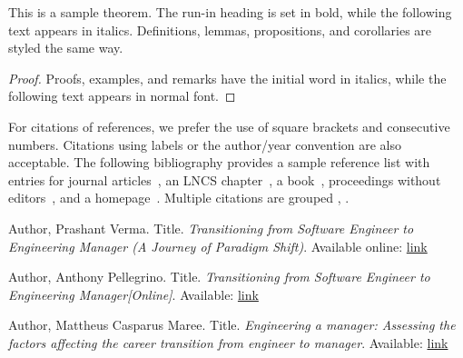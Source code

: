 \documentclass[runningheads]{llncs}
\begin{document}
\begin{theorem}
This is a sample theorem. The run-in heading is set in bold, while
the following text appears in italics. Definitions, lemmas,
propositions, and corollaries are styled the same way.
\end{theorem}
%
%
\begin{proof}
Proofs, examples, and remarks have the initial word in italics,
while the following text appears in normal font.
\end{proof}
For citations of references, we prefer the use of square brackets
and consecutive numbers. Citations using labels or the author/year
convention are also acceptable. The following bibliography provides
a sample reference list with entries for journal
articles~\cite{ref_article1}, an LNCS chapter~\cite{ref_lncs1}, a
book~\cite{ref_book1}, proceedings without editors~\cite{ref_proc1},
and a homepage~\cite{ref_url1}. Multiple citations are grouped
\cite{ref_article1,ref_lncs1,ref_book1},
\cite{ref_article1,ref_book1,ref_proc1,ref_url1}.
%
%
%
% 
% 
%

\begin{thebibliography}{8}

Author, Prashant Verma. Title. \emph{Transitioning from Software Engineer to Engineering Manager (A Journey of Paradigm Shift)}. Available online: \href{https://scholar.google.com/citations?view_op=view_citation&hl=en&user=YFZ7DDkAAAAJ&citation_for_view=YFZ7DDkAAAAJ:Tyk-4Ss8FVUC}{link}
  
Author, Anthony Pellegrino. Title. \emph{Transitioning from Software Engineer to Engineering Manager[Online]}. Available:
\href{https://blog.tryexponent.com/transitioning-from-software-engineer-toengineering-manager/}{link}

Author, Mattheus Casparus Maree. Title. \emph{Engineering a manager: Assessing the factors affecting the career transition from engineer to manager}. Available:
\href{https://api.semanticscholar.org/CorpusID:209784964}{link}

\end{thebibliography}
\end{document}

